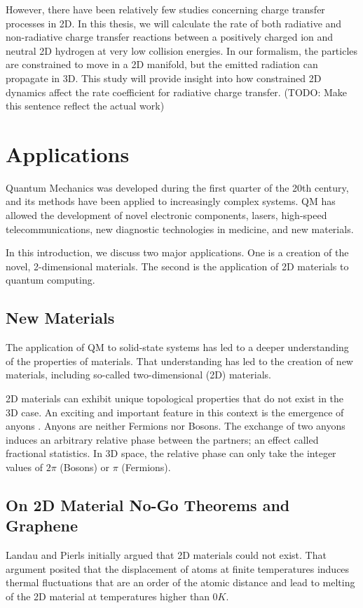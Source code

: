 However, there have been relatively few studies concerning charge transfer processes in 2D.
In this thesis, we will calculate the rate of both radiative 
and non-radiative charge transfer reactions between a positively charged ion and neutral 2D hydrogen at very low collision energies. In our formalism, the particles are constrained to move in a 2D manifold, but the emitted radiation can propagate in 3D. This study will provide insight into how constrained 2D dynamics affect the rate coefficient for radiative charge transfer.
 (TODO: Make this sentence reflect the actual work)

\section{Applications}
Quantum Mechanics was developed during the first quarter of the 20th century, and its methods have been applied to increasingly complex systems. QM has allowed the development of novel electronic components, lasers, high-speed telecommunications, new diagnostic technologies in medicine, and new materials.

 In this introduction, we discuss two major applications.
 One is a creation of the novel, 2-dimensional materials.
 The second is the application of 2D materials to quantum computing.
 
 \subsection{New Materials}

The application of QM to solid-state systems has led to a deeper understanding of the properties of materials. That understanding has led to the creation of new materials, including so-called two-dimensional (2D) materials.
 
2D materials can exhibit unique topological properties that do not exist in the 3D case. An exciting and important feature in this context is the emergence of anyons \cite{anyonsR}. Anyons are neither Fermions nor Bosons. The exchange of two anyons induces an arbitrary relative phase between the partners; an effect called fractional statistics.
In 3D space, the relative phase can only take the integer values of $2 \pi $ (Bosons) or $ \pi$ (Fermions).
 
\subsection{On 2D Material No-Go Theorems and
Graphene}
Landau and Pierls\cite{LandauG}\cite{Pierls} initially argued that 2D materials could not exist. That argument posited that the displacement of atoms at finite temperatures induces thermal fluctuations that are an order of the atomic distance\cite{LandauG, Pierls} and lead to melting of the 2D material at temperatures higher than $ 0 K $. 

